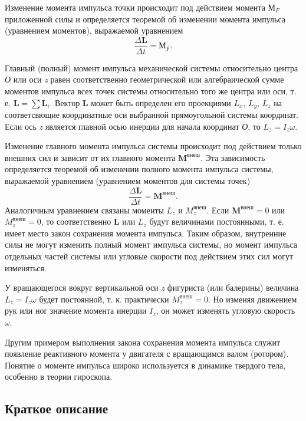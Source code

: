 \documentclass[All.tex]{subfiles}
\begin{document}
	Изменение момента импульса точки происходит под действием момента $ \textbf{М}_F $ приложенной силы и определяется теоремой об изменении момента импульса (уравнением моментов), выражаемой уравнением
	$$ \frac{\Delta \textbf{L}}{\Delta t}  = \textbf{М}_F.$$
	
	Главный (полный) момент импульса механической системы относительно центра \textit{О} или оси \textit{z} равен соответственно геометрической или алгебраической сумме моментов импульса всех точек системы относительно того же центра или оси, т. е. $ \textbf{L} = \sum \textbf{L}_i $. 
	Вектор \textbf{L} может быть определен его проекциями $ L_x $, $ L_y $, $ L_z $ на соответсвющие координатные оси выбранной прямоугольной системы координат.
	Если ось \textit{z} является главной осью инерции для начала координат \textit{О}, то $ L_z = I_z\omega $.
	
	Изменение главного момента импульса системы происходит под действием только внешних сил и зависит от их главного момента $ \textbf{M}^\text{внеш} $.
	Эта зависимость определяется теоремой об изменении полного момента импульса системы, выражаемой уравнением (уравнением моментов для системы точек) $$ \frac{\Delta \textbf{L}}{\Delta t} = \textbf{M}^\text{внеш}.$$
	Аналогичным уравнением связаны моменты $ L_z $ и $ M_z^\text{внеш} $.
	Если $ \textbf{M}^\text{внеш}=0 $ или $ M_z^\text{внеш}=0 $, то соответственно \textbf{L} или $ L_z $ будут величинами постоянными, т. е. имеет место закон сохранения момента импульса.
	Таким образом, внутренние силы не могут изменить полный момент импульса системы, но момент импульса отдельных частей системы или угловые скорости под действием этих сил могут изменяться.
	
У вращающегося вокруг вертикальной оси \textit{z} фигуриста (или балерины) величина $ L_z = I_z\omega $ будет постоянной, т. к. практически $ M_z^\text{внеш}=0 $.
	Но изменяя движением рук или ног значение момента инерции $ I_z $, он может изменять угловую скорость $ \omega $.
	
	Другим примером выполнения закона сохранения момента импульса служит появление реактивного момента у двигателя с вращающимся валом (ротором).
	Понятие о моменте импульса широко используется в динамике твердого тела, особенно в теории гироскопа.
		
	\subsection*{\textcolor{PineGreen}{Краткое описание}}
	
\end{document}
